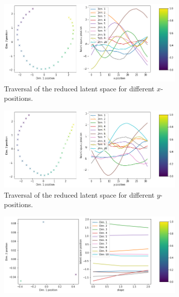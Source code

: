 \documentclass[11pt,a4paper]{article}
\begin{document}
\begin{figure}[H]
\centering
\begin{subfigure}{.48\textwidth}
\includegraphics[width=\textwidth]{images/latent_space_traversals/vae_3750_dsprites_latent_space_values_x_position.png}
\caption{Traversal of the reduced latent space for different $x$-positions.}
\end{subfigure}
\begin{subfigure}{.48\textwidth}
\includegraphics[width=\textwidth]{images/latent_space_traversals/vae_3750_dsprites_latent_space_values_y_position.png}
\caption{Traversal of the reduced latent space for different $y$-positions.}
\end{subfigure}
\begin{subfigure}{.48\textwidth}
\includegraphics[width=\textwidth]{images/latent_space_traversals/vae_3750_dsprites_latent_space_values_shape.png}

\end{subfigure}
\end{figure}
\end{document}
